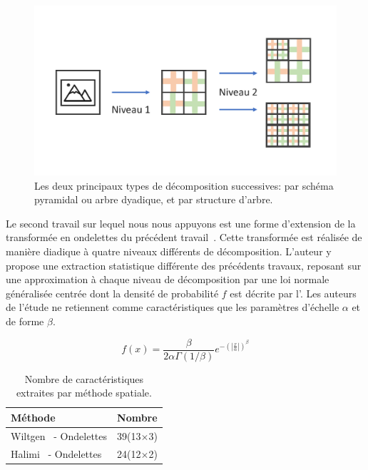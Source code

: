 \begin{figure}[H]
    \centering
    \includegraphics[width=\textwidth]{contents/chapter_5/resources/scheme_dwt_decomposition.pdf}
    \caption{Les deux principaux types de décomposition successives: par schéma pyramidal ou arbre dyadique, et par structure d'arbre.}
    \label{fig:scheme_dwt_decomposition}
\end{figure}\par

Le second travail sur lequel nous nous appuyons est une forme d'extension de la transformée en ondelettes du précédent travail~\cite{Halimi2017a}. Cette transformée est réalisée de manière diadique à quatre niveaux différents de décomposition. L'auteur y propose une extraction statistique différente des précédents travaux, reposant sur une approximation à chaque niveau de décomposition par une loi normale généralisée centrée dont la densité de probabilité $f$ est décrite par l'. Les auteurs de l'étude ne retiennent comme caractéristiques que les paramètres d'échelle $\alpha$ et de forme $\beta$.\par
\begin{equation}
    f(x)= \frac{\beta}{2\alpha\Gamma(1/\beta)} e^{-\left(|\frac{x}{\alpha}|\right)^\beta}
    \label{eq:ggd}
\end{equation}

\begin{table}[h]
    \centering
    \begin{tabular*}{0.6\linewidth}{l@{\extracolsep{\fill}}l}
        \toprule
        \textbf{Méthode}                        & \textbf{Nombre}   \\ \hline
        Wiltgen~\cite{Wiltgen2008} - Ondelettes & 39(13$\times$3)   \\ \hline
        Halimi~\cite{Halimi2017a} - Ondelettes  & 24(12$\times$2)   \\
        \bottomrule
    \end{tabular*}
    \caption{Nombre de caractéristiques extraites par méthode spatiale.}
    \label{tab:number_features}
\end{table}\par


